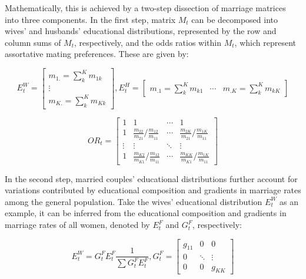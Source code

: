 Mathematically, this is achieved by a two-step dissection of marriage matrices into three components. In the first step, matrix $M_{t}$ can be decomposed into wives' and husbands' educational distributions, represented by the row and column sums of $M_{t}$, respectively, and the odds ratios within $M_{t}$, which represent assortative mating preferences. These are given by:

\begin{equation}
    E_t^W = \begin{bmatrix}
        m_{1.} = \sum\limits_{k}^K m_{1k} \\
        \vdots                            \\
        m_{K.} = \sum\limits_{k}^K m_{Kk}
    \end{bmatrix},
    E_t^H = \begin{bmatrix}
        m_{.1} = \sum\limits_{k}^K m_{k1} & \cdots & m_{.K} = \sum\limits_{k}^K m_{kK}
    \end{bmatrix}
\end{equation}

\begin{equation}
    OR_t = \begin{bmatrix}
        1      & 1                                           & \cdots & 1                                           \\
        1      & \frac{m_{22}}{m_{21}}/\frac{m_{12}}{m_{11}} & \cdots & \frac{m_{2K}}{m_{21}}/\frac{m_{1K}}{m_{11}} \\
        \vdots & \vdots                                      & \ddots & \vdots                                      \\
        1      & \frac{m_{K2}}{m_{K1}}/\frac{m_{12}}{m_{11}} & \cdots & \frac{m_{KK}}{m_{K1}}/\frac{m_{1K}}{m_{11}}
    \end{bmatrix}
\end{equation}

In the second step, married couples' educational distributions further account for variations contributed by educational composition and gradients in marriage rates among the general population. Take the wives' educational distribution $E_{t}^{W}$ as an example, it can be inferred from the educational composition and gradients in marriage rates of all women, denoted by $E_{t}^{F}$ and $G_{t}^{F}$, respectively:

\begin{equation}
    E_t^W = G_t^F E_t^F \frac{1}{\sum G_t^F E_t^F}, G_t^F = \begin{bmatrix}
        g_{11} & 0      & 0      \\
        0      & \ddots & \vdots \\
        0      & 0      & g_{KK}
    \end{bmatrix}
\end{equation}

